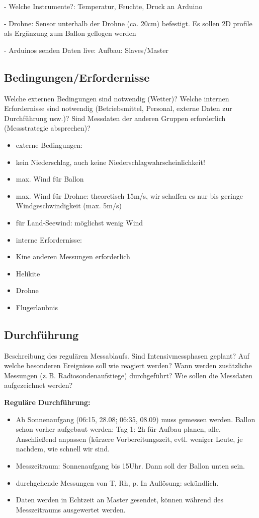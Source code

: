 \documentclass[a4paper,11pt,DIV=calc,tablecaptionabove,headinclude,twoside]{article}
\begin{document}
- Welche Instrumente?: Temperatur, Feuchte, Druck an Arduino

- Drohne: Sensor unterhalb der Drohne (ca. 20cm) befestigt. Es sollen 2D profile als Ergänzung zum Ballon geflogen werden %

- Arduinos senden Daten live: Aufbau: Slaves/Master
\subsection{Bedingungen/Erfordernisse}
Welche externen Bedingungen sind notwendig (Wetter)? Welche internen Erfordernisse sind notwendig (Betriebsmittel, Personal, externe Daten zur Durchführung usw.)? Sind Messdaten der anderen Gruppen erforderlich (Messstrategie absprechen)?


\begin{itemize}
\item externe Bedingungen:
	\item kein Niederschlag, auch keine Niederschlagwahrscheinlichkeit!
	\item max. Wind für Ballon %
	\item max. Wind für Drohne: theoretisch 15m/s, wir schaffen es nur bis geringe Windgeschwindigkeit (max. 5m/s)
	\item für Land-Seewind: möglichst wenig Wind\\
	
\item interne Erfordernisse:
	\item Kine anderen Messungen erforderlich
	\item Helikite
	\item Drohne
	\item Flugerlaubnis
\end{itemize}

\subsection{Durchführung}
Beschreibung des regulären Messablaufs. Sind Intensivmessphasen geplant? Auf welche besonderen Ereignisse soll wie reagiert werden? 
Wann werden zusätzliche Messungen (z.\,B. Radiosondenaufstiege) durchgeführt?
Wie sollen die Messdaten aufgezeichnet werden? 

\textbf{Reguläre Durchführung:}\\
\begin{itemize}
\item Ab Sonnenaufgang (06:15, 28.08; 06:35, 08.09) muss gemessen werden. Ballon schon vorher aufgebaut werden: Tag 1: 2h für Aufbau planen, alle. Anschließend anpassen (kürzere Vorbereitungszeit, evtl. weniger Leute, je nachdem, wie schnell wir sind.
\item Messzeitraum: Sonnenaufgang bis 15Uhr. Dann soll der Ballon unten sein.
\item durchgehende Messungen von T, Rh, p. In Auflösung: sekündlich.
\item Daten werden in Echtzeit an Master gesendet, können während des Messzeitraums ausgewertet werden.
\end{itemize}
\end{document}
